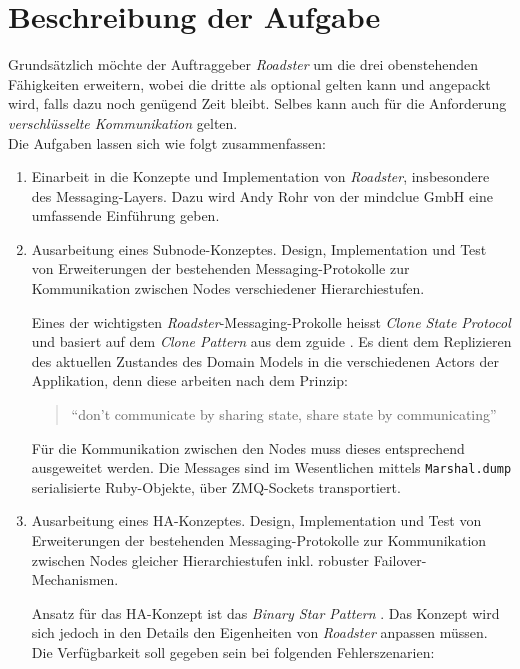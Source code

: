\documentclass[a4paper]{article}
\newcommand{\rb}[1]{\lstinline[style=customruby]{#1}} %
\begin{document}
\section{Beschreibung der Aufgabe}

Grundsätzlich möchte der Auftraggeber \emph{Roadster} um die drei obenstehenden
Fähigkeiten erweitern, wobei die dritte als optional gelten kann und angepackt
wird, falls dazu noch genügend Zeit bleibt. Selbes kann auch für die
Anforderung \emph{verschlüsselte Kommunikation} gelten.\\

Die Aufgaben lassen sich wie folgt zusammenfassen:

\begin{enumerate}
	\item Einarbeit in die Konzepte und Implementation von \emph{Roadster},
		insbesondere des Messaging-Layers. Dazu wird Andy Rohr von der
		mindclue GmbH eine umfassende Einführung geben.

	\item Ausarbeitung eines Subnode-Konzeptes. Design, Implementation und
		Test von Erweiterungen der bestehenden Messaging-Protokolle zur
		Kommunikation zwischen Nodes verschiedener Hierarchiestufen.

		Eines der wichtigsten \emph{Roadster}-Messaging-Prokolle heisst
		\emph{Clone State Protocol} und basiert auf dem \emph{Clone
		Pattern} aus dem zguide \cite{zguide:clone-pattern}. Es dient
		dem Replizieren des aktuellen Zustandes des Domain Models in
		die verschiedenen Actors der Applikation, denn diese arbeiten
		nach dem Prinzip:

		\begin{quote}
		``don't communicate by sharing state, share state by communicating''
		\end{quote}

		Für die Kommunikation zwischen den Nodes muss dieses
		entsprechend ausgeweitet werden. Die Messages sind im
		Wesentlichen mittels \rb{Marshal.dump} serialisierte Ruby-Objekte,
		über ZMQ-Sockets transportiert.

	\item Ausarbeitung eines HA-Konzeptes. Design, Implementation und Test
		von Erweiterungen der bestehenden Messaging-Protokolle zur
		Kommunikation zwischen Nodes gleicher Hierarchiestufen inkl.
		robuster Failover-Mechanismen.

		Ansatz für das HA-Konzept ist das \emph{Binary Star Pattern}
		\cite{zguide:binary-star}\cite{zguide:adding-binary-star}. Das
		Konzept wird sich jedoch in den Details den Eigenheiten von
		\emph{Roadster} anpassen müssen. Die Verfügbarkeit soll gegeben
		sein bei folgenden Fehlerszenarien:


\end{enumerate}
\end{document}
